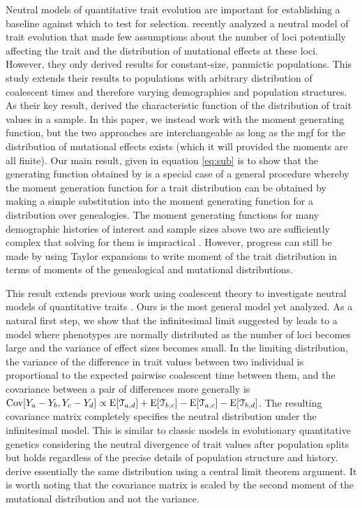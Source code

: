 Neutral models of quantitative trait evolution are important for establishing a
baseline against which to test for selection. \citet{Schraiber2015} recently
analyzed a neutral model of trait evolution that made few assumptions about the
number of loci potentially affecting the trait and the distribution of
mutational effects at these loci. However, they only derived results for
constant-size, panmictic populations. This study extends their results to
populations with arbitrary distribution of coalescent times and therefore
varying demographies and population structures. As their key result,
\citet{Schraiber2015} derived the characteristic function of the distribution of
trait values in a sample. In this paper, we instead work with the moment
generating function, but the two approaches are interchangeable as long as the
mgf for the distribution of mutational effects exists (which it will provided
the moments are all finite). Our main result, given in equation \eqref{eq:sub}
is to show that the generating function obtained by \citet{Schraiber2015} is a
special case of a general procedure whereby the moment generation function for a
trait distribution can be obtained by making a simple substitution into the
moment generating function for a distribution over genealogies. The moment
generating functions for many demographic histories of interest and sample sizes
above two are sufficiently complex that solving for them is impractical
\citep{Lohse2011}. However, progress can still be made by using Taylor
expansions to write moment of the trait distribution in terms of moments of the
genealogical and mutational distributions.

This result extends previous work using coalescent theory to investigate neutral
models of quantitative traits \citep{Whitlock1999,Schraiber2015}. Ours is the
most general model yet analyzed. As a natural first step, we show that the
infinitesimal limit suggested by \citet{Fisher1918} leads to a model where
phenotypes are normally distributed as the number of loci becomes large and the
variance of effect sizes becomes small. In the limiting distribution, the
variance of the difference in trait values between two individual is
proportional to the expected pairwise coalescent time between them, and the
covariance between a pair of differences more generally is $\mathrm{Cov}[Y_a - Y_b,Y_c -
Y_d] \propto \mathrm{E}[\mathcal{T}_{a,d}] + \mathrm{E}[\mathcal{T}_{b,c}] -
\mathrm{E}[\mathcal{T}_{a,c}] - \mathrm{E}[\mathcal{T}_{b,d}]$. The resulting covariance matrix
completely specifies the neutral distribution under the infinitesimal model.
This is similar to classic models in evolutionary quantitative genetics
considering the neutral divergence of trait values after population splits
\citep{Lande1976,Lynch1989} but holds regardless of the precise details of
population structure and history. \citet{Schraiber2015} derive essentially the
same distribution using a central limit theorem argument. It is worth noting
that the covariance matrix is scaled by the second moment of the mutational
distribution and not the variance.


